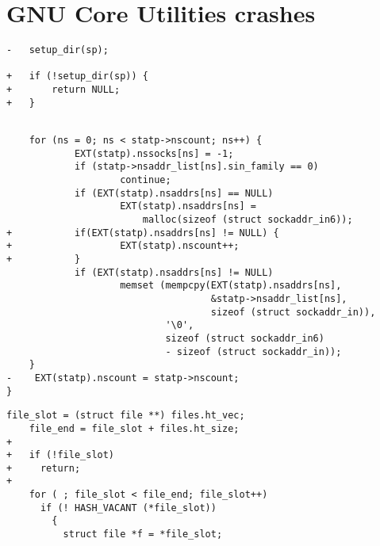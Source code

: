 \section{GNU Core Utilities crashes}

\lstset{numbers=left}
\begin{lstlisting}[label={lst:du/malloc},firstnumber=986, caption={\texttt{du} crashes when \texttt{malloc} returns an error. The offending code is in the coreutils 8.25 source code, in \texttt{lib/fts.c:986}.}]
-	setup_dir(sp);

+	if (!setup_dir(sp)) {
+		return NULL;
+	}
\end{lstlisting}

\begin{lstlisting}[label={lst:hostid/malloc},firstnumber=425, caption={\texttt{hostid} crashes when \texttt{malloc} returns an error. The offending code is in the GLibC 2.23 source code, in \texttt{resolv/res\_send.c:453}.}]

    for (ns = 0; ns < statp->nscount; ns++) {
            EXT(statp).nssocks[ns] = -1;
            if (statp->nsaddr_list[ns].sin_family == 0)
                    continue;
            if (EXT(statp).nsaddrs[ns] == NULL)
                    EXT(statp).nsaddrs[ns] =
                        malloc(sizeof (struct sockaddr_in6));
+	        if(EXT(statp).nsaddrs[ns] != NULL) {
+	                EXT(statp).nscount++;
+	        }
            if (EXT(statp).nsaddrs[ns] != NULL)
                    memset (mempcpy(EXT(statp).nsaddrs[ns],
                                    &statp->nsaddr_list[ns],
                                    sizeof (struct sockaddr_in)),
                            '\0',
                            sizeof (struct sockaddr_in6)
                            - sizeof (struct sockaddr_in));
    }
-    EXT(statp).nscount = statp->nscount;
}
\end{lstlisting}

\begin{lstlisting}[label={lst:make/calloc},firstnumber=278, caption={\texttt{make} crashes when \texttt{calloc} returns an error. The offending code is in the Make 4.2 source code, in \texttt{file.c:278}.}]
	file_slot = (struct file **) files.ht_vec;
	file_end = file_slot + files.ht_size;
+	
+	if (!file_slot)
+	  return;
+	
	for ( ; file_slot < file_end; file_slot++)
	  if (! HASH_VACANT (*file_slot))
	    {
	      struct file *f = *file_slot;                                          
\end{lstlisting}
